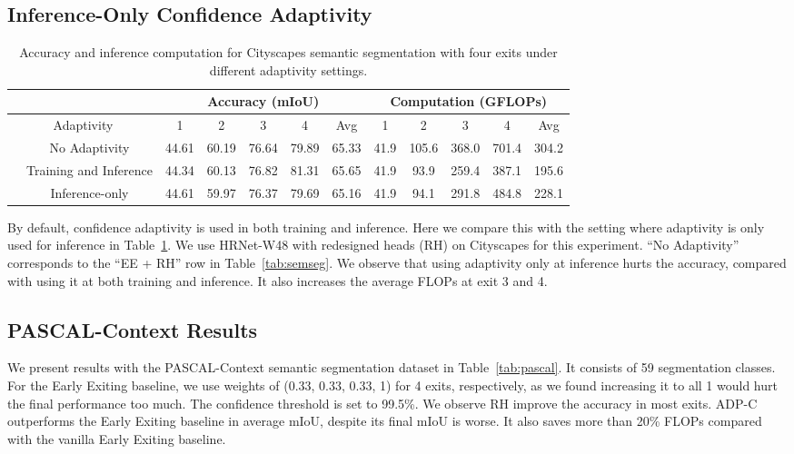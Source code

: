 \subsection{Inference-Only Confidence Adaptivity}
\begin{table}[!htbp]
\vspace{0ex}
\centering
\small
\begin{tabular}{cc|ccccc|ccccc}
\hline
\multicolumn{2}{c|}{}                            & \multicolumn{5}{c}{Accuracy (mIoU)}         & \multicolumn{5}{|c}{Computation (GFLOPs)}            \\ \hline
\multicolumn{2}{c|}{Adaptivity}             & 1    & 2    & 3    & 4    & Avg  & 1     & 2     & 3     & 4      & Avg   \\ \hline
& No Adaptivity & 44.61  & 60.19 &  76.64  & 79.89 & 65.33   &   41.9 & 105.6 & 368.0 & 701.4 & 304.2  \\ 
& Training and Inference & 44.34 &  60.13 & 76.82 & 81.31  & 65.65 & 41.9 & 93.9 & 259.4 & 387.1 & 195.6  \\ 
& Inference-only & 44.61 &  59.97 &  76.37 &  79.69 & 65.16     & 41.9 &  94.1 &  291.8 & 484.8 & 228.1  \\ \hline
\end{tabular}
\caption{%
Accuracy and inference computation for Cityscapes semantic segmentation with four exits under different adaptivity settings.
}
\label{tab:inference-only}
\end{table}

By default, confidence adaptivity is used in both training and inference. Here we compare this with the setting where adaptivity is only used for inference in Table~\ref{tab:inference-only}. We use HRNet-W48 with redesigned heads (RH) on Cityscapes for this experiment. ``No Adaptivity'' corresponds to the ``EE + RH'' row in Table~\ref{tab:semseg}. We observe that using adaptivity only at inference hurts the accuracy, compared with using it at both training and inference. It also increases the average FLOPs at exit 3 and 4.



\subsection{PASCAL-Context Results}
We present results with the PASCAL-Context semantic segmentation dataset \cite{mottaghi_cvpr14} in Table~\ref{tab:pascal}. It consists of 59 segmentation classes.
For the Early Exiting baseline, we use weights of (0.33, 0.33, 0.33, 1) for 4 exits, respectively, as we found increasing it to all 1 would hurt the final performance too much. 
The confidence threshold is set to 99.5\%. We observe RH improve the accuracy in most exits. ADP-C outperforms the Early Exiting baseline in average mIoU, despite its final mIoU is worse. It also saves more than 20\% FLOPs compared with the vanilla Early Exiting baseline.


